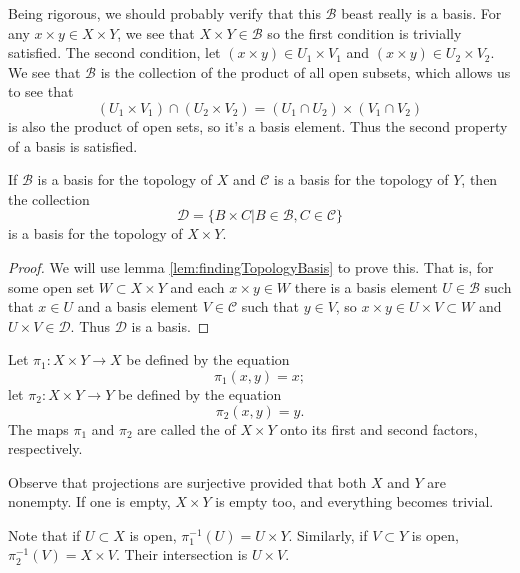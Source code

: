 \begin{rmk}\label{rmk:productTopologyBasis}
Being rigorous, we should probably verify that this $\mathscr{B}$
beast really is a basis. For any $x\times y\in X\times Y$, we see
that $X\times Y\in\mathscr{B}$ so the first condition is
trivially satisfied. The second condition, let $(x\times y)\in
U_{1}\times V_{1}$ and $(x\times y)\in U_{2}\times V_{2}$. We see
that $\mathscr{B}$ is the collection of the product of all open
subsets, which allows us to see that
\begin{equation}%
(U_{1}\times V_{1})\cap(U_{2}\times V_{2}) = (U_{1}\cap
  U_{2})\times(V_{1}\cap V_{2})
\end{equation}
is also the product of open sets, so it's a basis element. Thus
the second property of a basis is satisfied.
\end{rmk}
\begin{thm}\label{thm:productOfBases}
If $\mathscr{B}$ is a basis for the topology of $X$ and
$\mathscr{C}$ is a basis for the topology of $Y$, then the
collection
\begin{equation}%
\mathscr{D} = \{B\times C|B\in\mathscr{B},C\in\mathscr{C}\}
\end{equation}
is a basis for the topology of $X\times Y$.
\end{thm}
\begin{proof}
We will use lemma \ref{lem:findingTopologyBasis} to prove
this. That is, for some open set $W\subset X\times Y$ and each
$x\times y\in W$ there is a basis element $U\in\mathscr{B}$ such
that $x\in U$ and a basis element $V\in\mathscr{C}$ such that
$y\in V$, so $x\times y\in U\times V\subset W$ and $U\times
V\in\mathscr{D}$. Thus $\mathscr{D}$ is a basis.
\end{proof}
\begin{defn}\label{defn:projection}
Let $\pi_{1}:X\times Y\to X$ be defined by the equation
\begin{equation}%
\pi_{1}(x,y)=x;
\end{equation}
let $\pi_{2}:X\times Y\to Y$ be defined by the equation
\begin{equation}%
\pi_{2}(x,y) = y.
\end{equation}
The maps $\pi_{1}$ and $\pi_{2}$ are called the
 of $X\times Y$ onto its first and second
factors, respectively.
\end{defn}
\begin{rmk}\label{rmk:projectionsAreSurjective}
Observe that projections are surjective provided that both $X$
and $Y$ are nonempty. If one is empty, $X\times Y$ is empty too,
and everything becomes trivial.
\end{rmk}
\begin{rmk}\label{rmk:inverseOfProjections}
Note that if $U\subset X$ is open, $\pi_{1}^{-1}(U)=U\times
Y$. Similarly, if $V\subset Y$ is open, $\pi_{2}^{-1}(V)=X\times
V$. Their intersection is $U\times V$.
\end{rmk}

